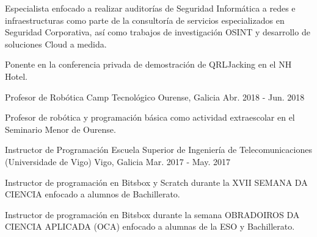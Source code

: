 \documentclass[11pt, a4paper]{style}
\begin{document}
\begin{cventries}
    {
      \begin{cvitems} %
        \item {Especialista enfocado a realizar auditorías de Seguridad Informática a redes e infraestructuras como parte de la consultoría de servicios especializados en Seguridad Corporativa, así como trabajos de investigación OSINT y desarrollo de soluciones Cloud a medida.}
        \item {Ponente en la conferencia privada de demostración de QRLJacking en el NH Hotel.}
      \end{cvitems}
    }
  \cventry
    {Profesor de Robótica} %
    {Camp Tecnológico} %
    {Ourense, Galicia} %
    {Abr. 2018 - Jun. 2018} %
    {
      \begin{cvitems} %
        \item {Profesor de robótica y programación básica como actividad extraescolar en el Seminario Menor de Ourense.}
      \end{cvitems}
    }
  \cventry
    {Instructor de Programación} %
    {Escuela Superior de Ingeniería de Telecomunicaciones (Universidade de Vigo)} %
    {Vigo, Galicia} %
    {Mar. 2017 - May. 2017} %
    {
      \begin{cvitems} %
        \item {Instructor de programación en Bitsbox y Scratch durante la XVII SEMANA DA CIENCIA enfocado a alumnos de Bachillerato.}
        \item {Instructor de programación en Bitsbox durante la semana OBRADOIROS DA CIENCIA APLICADA (OCA) enfocado a alumnas de la ESO y Bachillerato.}
      \end{cvitems}
    }
\end{cventries}
\end{document}
